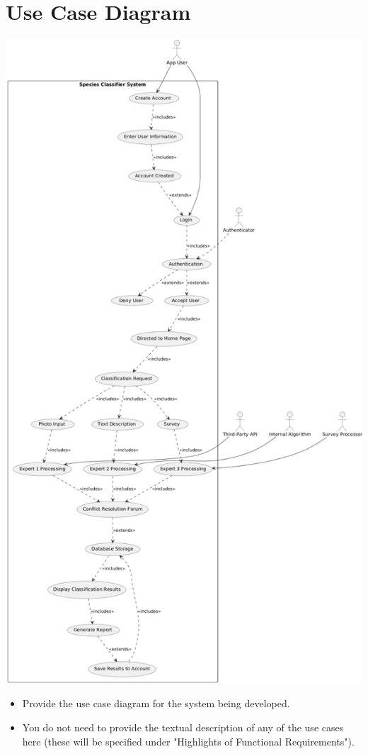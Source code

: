 \documentclass[]{article}
\begin{document}
\section{Use Case Diagram}
\label{sec:use_case_diagram}
\includegraphics[scale=0.8]{3Diagram.png}
\begin{itemize}
	\item Provide the use case diagram for the system being developed.
	\item You do not need to provide the textual description of any of the use cases here (these will be specified under "Highlights of Functional Requirements").
\end{itemize}
\end{document}
